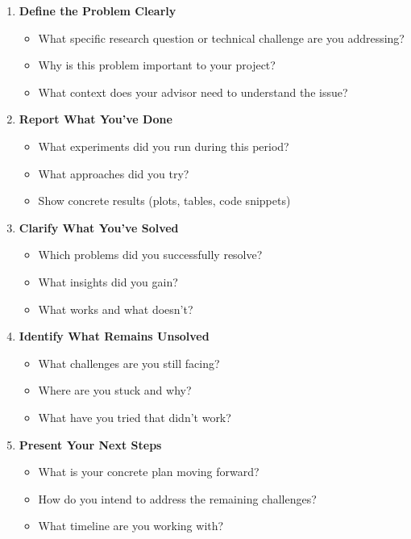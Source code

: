 \documentclass[11pt,a4paper]{article}
\begin{document}
\begin{enumerate}[leftmargin=1.5em]
    \item \textbf{Define the Problem Clearly}
    \begin{itemize}
        \item What specific research question or technical challenge are you addressing?
        \item Why is this problem important to your project?
        \item What context does your advisor need to understand the issue?
    \end{itemize}

    \item \textbf{Report What You've Done}
    \begin{itemize}
        \item What experiments did you run during this period?
        \item What approaches did you try?
        \item Show concrete results (plots, tables, code snippets)
    \end{itemize}

    \item \textbf{Clarify What You've Solved}
    \begin{itemize}
        \item Which problems did you successfully resolve?
        \item What insights did you gain?
        \item What works and what doesn't?
    \end{itemize}

    \item \textbf{Identify What Remains Unsolved}
    \begin{itemize}
        \item What challenges are you still facing?
        \item Where are you stuck and why?
        \item What have you tried that didn't work?
    \end{itemize}

    \item \textbf{Present Your Next Steps}
    \begin{itemize}
        \item What is your concrete plan moving forward?
        \item How do you intend to address the remaining challenges?
        \item What timeline are you working with?
    \end{itemize}


\end{enumerate}
\end{document}
